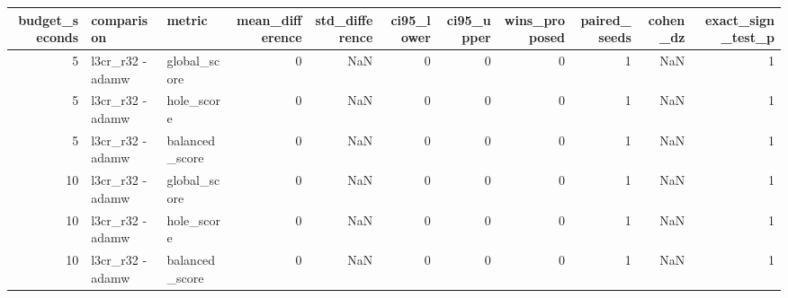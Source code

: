 \begin{tabular}{rllrrrrrrrr}
\toprule
budget_seconds & comparison & metric & mean_difference & std_difference & ci95_lower & ci95_upper & wins_proposed & paired_seeds & cohen_dz & exact_sign_test_p \\
\midrule
5 & l3cr_r32 - adamw & global_score & 0 & NaN & 0 & 0 & 0 & 1 & NaN & 1 \\
5 & l3cr_r32 - adamw & hole_score & 0 & NaN & 0 & 0 & 0 & 1 & NaN & 1 \\
5 & l3cr_r32 - adamw & balanced_score & 0 & NaN & 0 & 0 & 0 & 1 & NaN & 1 \\
10 & l3cr_r32 - adamw & global_score & 0 & NaN & 0 & 0 & 0 & 1 & NaN & 1 \\
10 & l3cr_r32 - adamw & hole_score & 0 & NaN & 0 & 0 & 0 & 1 & NaN & 1 \\
10 & l3cr_r32 - adamw & balanced_score & 0 & NaN & 0 & 0 & 0 & 1 & NaN & 1 \\
\bottomrule
\end{tabular}
